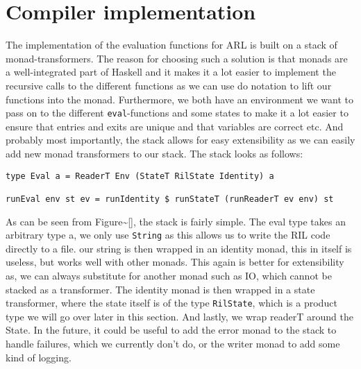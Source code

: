 \documentclass[a4paper]{article}
\begin{document}
\section{Compiler implementation}
\label{sec:orgaeb9201}
The implementation of the evaluation functions for ARL is built on a stack of monad-transformers. The reason for choosing such a solution is that monads are a well-integrated part of Haskell and it makes it a lot easier to implement the recursive calls to the different functions as we can use do notation to lift our functions into the monad. Furthermore, we both have an environment we want to pass on to the different \texttt{eval}-functions and some states to make it a lot easier to ensure that entries and exits are unique and that variables are correct etc. And probably most importantly, the stack allows for easy extensibility as we can easily add new monad transformers to our stack. The stack looks as follows:

\begin{verbatim}
type Eval a = ReaderT Env (StateT RilState Identity) a

runEval env st ev = runIdentity $ runStateT (runReaderT ev env) st
\end{verbatim}

As can be seen from Figure\textasciitilde{}\ref{}, the stack is fairly simple. The eval type takes an arbitrary type a, we only use \texttt{String} as this allows us to write the RIL code directly to a file. our string is then wrapped in an identity monad, this in itself is useless, but works well with other monads. This again is better for extensibility as, we can always substitute for another monad such as IO, which cannot be stacked as a transformer. The identity monad is then wrapped in a state transformer, where the state itself is of the type \texttt{RilState}, which is a product type we will go over later in this section. And lastly, we wrap readerT around the State. In the future, it could be useful to add the error monad to the stack to handle failures, which we currently don't do, or the writer monad to add some kind of logging.
\end{document}
